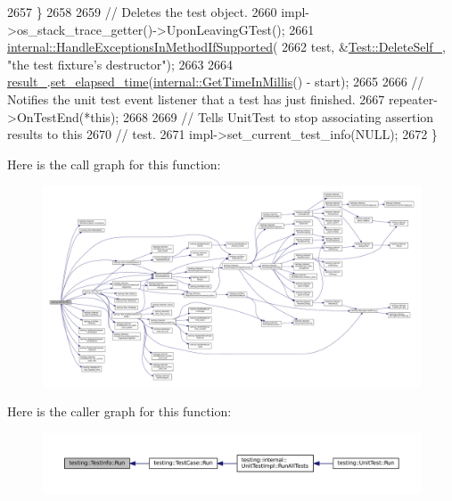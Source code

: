 \begin{DoxyCode}
2657   \}
2658 
2659   \textcolor{comment}{// Deletes the test object.}
2660   impl->os\_stack\_trace\_getter()->UponLeavingGTest();
2661   \hyperlink{namespacetesting_1_1internal_addb2ed165b92b74e25fe9ebe9e46b9f9}{internal::HandleExceptionsInMethodIfSupported}(
2662       test, &\hyperlink{classtesting_1_1Test_a3116f1f98ac889b11f1e3d981b8c6ca1}{Test::DeleteSelf\_}, \textcolor{stringliteral}{"the test fixture's destructor"});
2663 
2664   \hyperlink{classtesting_1_1TestInfo_a108fd469897a8d4e5c4361947a5ed785}{result\_}.\hyperlink{classtesting_1_1TestResult_aa345325e5dea41609d17d7c614bf2b18}{set\_elapsed\_time}(\hyperlink{namespacetesting_1_1internal_ae66b46943a429e6efb1db456d4cae90c}{internal::GetTimeInMillis}() - 
      start);
2665 
2666   \textcolor{comment}{// Notifies the unit test event listener that a test has just finished.}
2667   repeater->OnTestEnd(*\textcolor{keyword}{this});
2668 
2669   \textcolor{comment}{// Tells UnitTest to stop associating assertion results to this}
2670   \textcolor{comment}{// test.}
2671   impl->set\_current\_test\_info(NULL);
2672 \}
\end{DoxyCode}
Here is the call graph for this function\+:
\nopagebreak
\begin{figure}[H]
\begin{center}
\leavevmode
\includegraphics[width=350pt]{classtesting_1_1TestInfo_ade784915e9be3a01e3a6ef509b77d6c9_cgraph}
\end{center}
\end{figure}
Here is the caller graph for this function\+:
\nopagebreak
\begin{figure}[H]
\begin{center}
\leavevmode
\includegraphics[width=350pt]{classtesting_1_1TestInfo_ade784915e9be3a01e3a6ef509b77d6c9_icgraph}
\end{center}
\end{figure}
\mbox{\label{classtesting_1_1TestInfo_a866e33b5bc5ab2a6e5375fc7d3af0f96}} 
